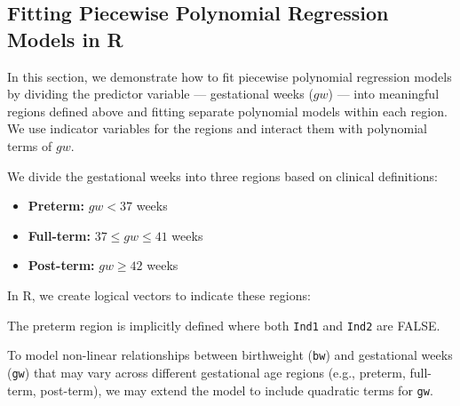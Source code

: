 \documentclass[
  letterpaper,
  DIV=11,
  numbers=noendperiod]{scrreprt}
\newenvironment{Shaded}{\begin{snugshade}}{\end{snugshade}}
\newcommand{\CommentTok}[1]{\textcolor[rgb]{0.37,0.37,0.37}{#1}}
\newcommand{\DecValTok}[1]{\textcolor[rgb]{0.68,0.00,0.00}{#1}}
\newcommand{\NormalTok}[1]{\textcolor[rgb]{0.00,0.23,0.31}{#1}}
\newcommand{\OtherTok}[1]{\textcolor[rgb]{0.00,0.23,0.31}{#1}}
\newcommand{\SpecialCharTok}[1]{\textcolor[rgb]{0.37,0.37,0.37}{#1}}
\providecommand{\tightlist}{%
  \setlength{\itemsep}{0pt}\setlength{\parskip}{0pt}}\usepackage{longtable,booktabs,array}
\begin{document}
\hypertarget{fitting-piecewise-polynomial-regression-models-in-r}{%
\subsection*{Fitting Piecewise Polynomial Regression Models in
R}\label{fitting-piecewise-polynomial-regression-models-in-r}}

In this section, we demonstrate how to fit piecewise polynomial
regression models by dividing the predictor variable --- gestational
weeks (\(gw\)) --- into meaningful regions defined above and fitting
separate polynomial models within each region. We use indicator
variables for the regions and interact them with polynomial terms of
\(gw\).

We divide the gestational weeks into three regions based on clinical
definitions:

\begin{itemize}
\tightlist
\item
  \textbf{Preterm:} \(gw < 37\) weeks\\
\item
  \textbf{Full-term:} \(37 \leq gw \leq 41\) weeks\\
\item
  \textbf{Post-term:} \(gw \geq 42\) weeks
\end{itemize}

In R, we create logical vectors to indicate these regions:

\begin{Shaded}
\end{Shaded}

The preterm region is implicitly defined where both \texttt{Ind1} and
\texttt{Ind2} are FALSE.

To model non-linear relationships between birthweight (\texttt{bw}) and
gestational weeks (\texttt{gw}) that may vary across different
gestational age regions (e.g., preterm, full-term, post-term), we may
extend the model to include quadratic terms for \texttt{gw}.
\end{document}
